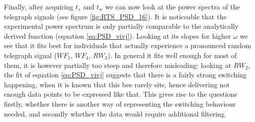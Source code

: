 
Finally, after acquiring $t_{s}$ and $t_{w}$ we can now look at the power spectra of the telegraph signals (see figure \ref{fig:RTS_PSD_16}). It is noticeable that the experimental power spectrum is only partially comparable to the analytically derived function (equation \ref{eq:PSD_vivj}). Looking at its slopes for higher $\omega$ we see that it fits best for individuals that actually experience a pronounced random telegraph signal ($WF_1$, $WF_4$, $RW_3$). In general it fits well enough for most of them, it is however partially too steep and therefore misleading: looking at $RW_2$, the fit of equation \ref{eq:PSD_vivj} suggests that there is a fairly strong switching happening, when it is known that this bee rarely sits, hence delivering not enough data points to be expressed like that. This gives rise to the questions firstly, whether there is another way of representing the switching behaviour needed, and secondly whether the data would require additional filtering.

